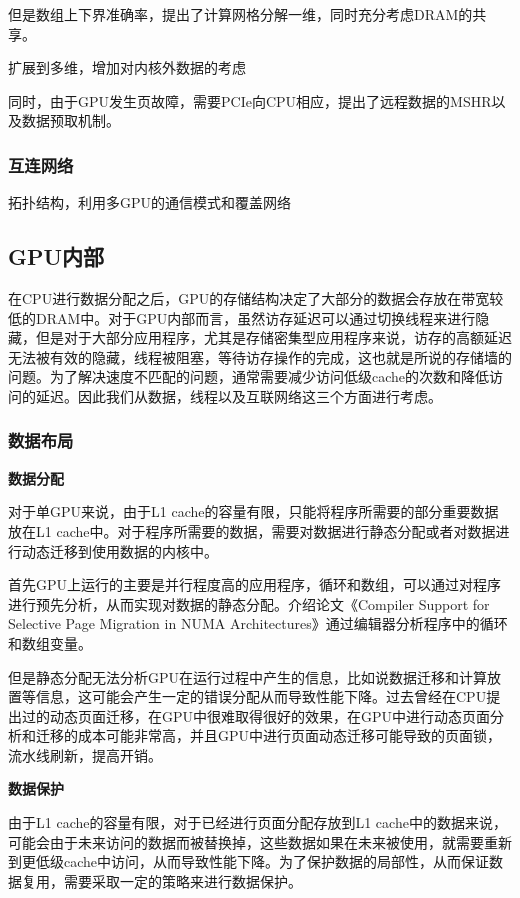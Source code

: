 \documentclass{cjc}
\begin{document}
但是数组上下界准确率，提出了计算网格分解一维，同时充分考虑DRAM的共享。

扩展到多维，增加对内核外数据的考虑

同时，由于GPU发生页故障，需要PCIe向CPU相应，提出了远程数据的MSHR以及数据预取机制。

\subsubsection{互连网络}

拓扑结构，利用多GPU的通信模式和覆盖网络


\subsection{GPU内部}

在CPU进行数据分配之后，GPU的存储结构决定了大部分的数据会存放在带宽较低的DRAM中。对于GPU内部而言，虽然访存延迟可以通过切换线程来进行隐藏，但是对于大部分应用程序，尤其是存储密集型应用程序来说，访存的高额延迟无法被有效的隐藏，线程被阻塞，等待访存操作的完成，这也就是所说的存储墙的问题。为了解决速度不匹配的问题，通常需要减少访问低级cache的次数和降低访问的延迟。因此我们从数据，线程以及互联网络这三个方面进行考虑。

\subsubsection{数据布局}

\textbf{数据分配}

对于单GPU来说，由于L1 cache的容量有限，只能将程序所需要的部分重要数据放在L1 cache中。对于程序所需要的数据，需要对数据进行静态分配或者对数据进行动态迁移到使用数据的内核中。

首先GPU上运行的主要是并行程度高的应用程序，循环和数组，可以通过对程序进行预先分析，从而实现对数据的静态分配。介绍论文《Compiler Support for Selective Page Migration in NUMA Architectures》通过编辑器分析程序中的循环和数组变量。

但是静态分配无法分析GPU在运行过程中产生的信息，比如说数据迁移和计算放置等信息，这可能会产生一定的错误分配从而导致性能下降。过去曾经在CPU提出过的动态页面迁移，在GPU中很难取得很好的效果，在GPU中进行动态页面分析和迁移的成本可能非常高，并且GPU中进行页面动态迁移可能导致的页面锁，流水线刷新，提高开销。

\textbf{数据保护}

由于L1 cache的容量有限，对于已经进行页面分配存放到L1 cache中的数据来说，可能会由于未来访问的数据而被替换掉，这些数据如果在未来被使用，就需要重新到更低级cache中访问，从而导致性能下降。为了保护数据的局部性，从而保证数据复用，需要采取一定的策略来进行数据保护。
\end{document}
